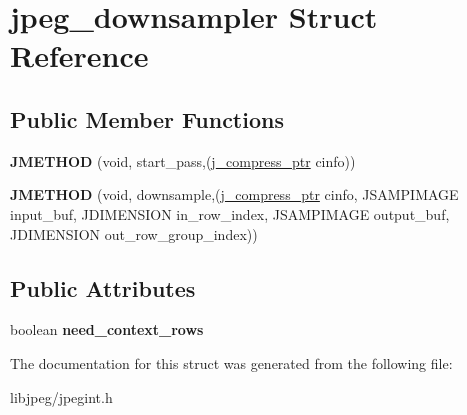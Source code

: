 \hypertarget{structjpeg__downsampler}{\section{jpeg\-\_\-downsampler Struct Reference}
\label{structjpeg__downsampler}
}
\subsection*{Public Member Functions}
\begin{DoxyCompactItemize}
\item 
\hypertarget{structjpeg__downsampler_a1ca33229e63cdb80020c714f1cd28ea0}{{\bfseries J\-M\-E\-T\-H\-O\-D} (void, start\-\_\-pass,(\hyperlink{structjpeg__compress__struct}{j\-\_\-compress\-\_\-ptr} cinfo))}\label{structjpeg__downsampler_a1ca33229e63cdb80020c714f1cd28ea0}

\item 
\hypertarget{structjpeg__downsampler_a611ebcb0ae11e4d1c6ba4222caacaec4}{{\bfseries J\-M\-E\-T\-H\-O\-D} (void, downsample,(\hyperlink{structjpeg__compress__struct}{j\-\_\-compress\-\_\-ptr} cinfo, J\-S\-A\-M\-P\-I\-M\-A\-G\-E input\-\_\-buf, J\-D\-I\-M\-E\-N\-S\-I\-O\-N in\-\_\-row\-\_\-index, J\-S\-A\-M\-P\-I\-M\-A\-G\-E output\-\_\-buf, J\-D\-I\-M\-E\-N\-S\-I\-O\-N out\-\_\-row\-\_\-group\-\_\-index))}\label{structjpeg__downsampler_a611ebcb0ae11e4d1c6ba4222caacaec4}

\end{DoxyCompactItemize}
\subsection*{Public Attributes}
\begin{DoxyCompactItemize}
\item 
\hypertarget{structjpeg__downsampler_ab177a119691924a4bdd2223df7f5ed08}{boolean {\bfseries need\-\_\-context\-\_\-rows}}\label{structjpeg__downsampler_ab177a119691924a4bdd2223df7f5ed08}

\end{DoxyCompactItemize}


The documentation for this struct was generated from the following file\-:\begin{DoxyCompactItemize}
\item 
libjpeg/jpegint.\-h\end{DoxyCompactItemize}
